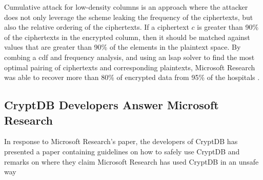 Cumulative attack for low-density columns is an approach where the attacker does not only leverage the scheme leaking the frequency of the ciphertexts, but also the relative ordering of the ciphertexts. If a ciphertext $c$ is greater than 90\% of the ciphertexts in the encrypted column, then it should be matched against values that are greater than 90\% of the elements in the plaintext space. By combing a \gls{cdf} and frequency analysis, and using an \gls{lsap} solver to find the most optimal pairing of ciphertexts and corresponding plaintexts, Microsoft Research was able to recover more than 80\% of encrypted data from 95\% of the hospitals \cite{microsoft_cryptdb}.

\subsection{CryptDB Developers Answer Microsoft Research}

In response to Microsoft Research's paper, the developers of CryptDB has presented a paper containing guidelines \cite{cryptdb_guidelines} on how to safely use CryptDB and remarks on where they claim Microsoft Research has used CryptDB in an unsafe way

\cite{popa_thesis}